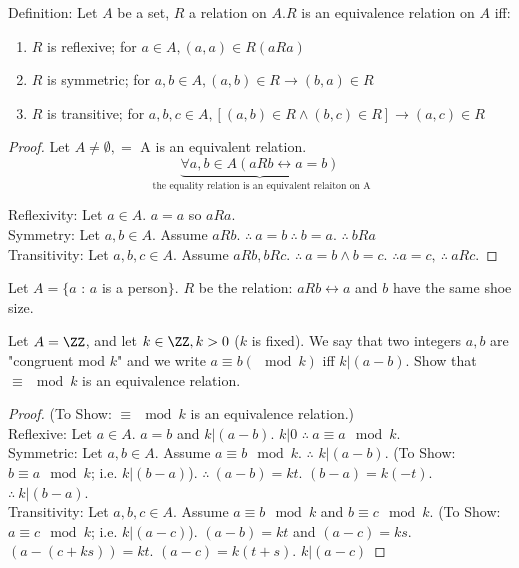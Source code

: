 Definition: Let $A$ be a set, $R$ a relation on $A$.$R$ is an equivalence relation on  $A$ iff:
\begin{enumerate}
\item $R$ is reflexive; for $a\in A, (a,a)\in R (aRa)$
\item $R$ is symmetric; for $a,b\in A, (a,b)\in R \to (b,a)\in R$
\item $R$ is transitive; for $a,b,c \in A, \left[(a,b)\in R \wedge (b,c) \in R \right] \to (a,c)\in R$
\end{enumerate}

\begin{proof}
Let $A\neq \emptyset, =$ A is an equivalent relation. \[ \underbrace{\forall a,b\in A (aRb \leftrightarrow a = b)}_{\text{ the equality relation is an equivalent relaiton on A}} \]

\noindent
Reflexivity: Let $a\in A$. $a=a$ so $aRa$. \checkmark \\
Symmetry: Let $a,b\in A$. Assume $aRb$. $\therefore\ a=b\ \therefore\ b=a$. $\therefore\ bRa$ \checkmark \\
Transitivity: Let $a,b,c\in A$. Assume $aRb, bRc$. $\therefore\ a=b \wedge b=c$. $\therefore a =c,\ \therefore\ aRc$.
\end{proof}
\begin{example}
Let $ A = \{ a$ : $a$ is a person$\}$. $R$ be the relation: $aRb \leftrightarrow a$ and $b$ have the same shoe size.
\end{example}
\begin{example}
Let $ A = \ZZ$, and let $k\in\ZZ, k > 0$ ($k$ is fixed). We say that two integers $a,b$ are "congruent mod $k$" and we write $a\equiv b (\mod k)$  iff $k|(a-b)$. Show that $\equiv\mod k$ is an equivalence relation.
\end{example}
\begin{proof} (To Show: $\equiv \mod k$ is an equivalence relation.) \\
Reflexive:  Let $a\in A$. $a=b$ and $k|(a-b)$. $k|0$ $\therefore\ a\equiv a \mod k$. \checkmark \\
Symmetric: Let $a,b\in A$. Assume $a\equiv b \mod k$. $\therefore$ $k|(a-b)$. (To Show: $b \equiv a \mod k$; i.e. $k|(b-a)$). $\therefore\ (a-b)=kt$. $(b-a)=k(-t)$. $\therefore\ k|(b-a)$. \checkmark \\
Transitivity: Let $a,b,c\in A$. Assume $a\equiv b \mod k$ and $b \equiv c \mod k$. (To Show: $a \equiv c \mod k$; i.e. $k|(a-c)$). $(a-b)=kt$ and $(a-c)=ks$. $(a-(c+ks))=kt$. $(a-c)=k(t+s)$. $k|(a-c)$ \checkmark
\end{proof}

